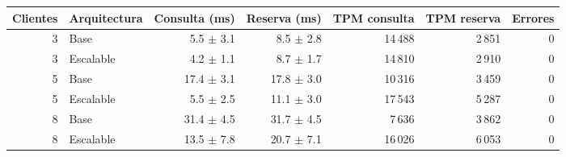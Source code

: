 \begin{tabular}{@{}rlrrrrr@{}}
\toprule
Clientes & Arquitectura & Consulta (ms) & Reserva (ms) & TPM consulta & TPM reserva & Errores \\
\midrule
3 & Base & 5.5 $\pm$ 3.1 & 8.5 $\pm$ 2.8 & 14\,488 & 2\,851 & 0 \\
3 & Escalable & 4.2 $\pm$ 1.1 & 8.7 $\pm$ 1.7 & 14\,810 & 2\,910 & 0 \\
\midrule
5 & Base & 17.4 $\pm$ 3.1 & 17.8 $\pm$ 3.0 & 10\,316 & 3\,459 & 0 \\
5 & Escalable & 5.5 $\pm$ 2.5 & 11.1 $\pm$ 3.0 & 17\,543 & 5\,287 & 0 \\
\midrule
8 & Base & 31.4 $\pm$ 4.5 & 31.7 $\pm$ 4.5 & 7\,636 & 3\,862 & 0 \\
8 & Escalable & 13.5 $\pm$ 7.8 & 20.7 $\pm$ 7.1 & 16\,026 & 6\,053 & 0 \\
\bottomrule
\end{tabular}
